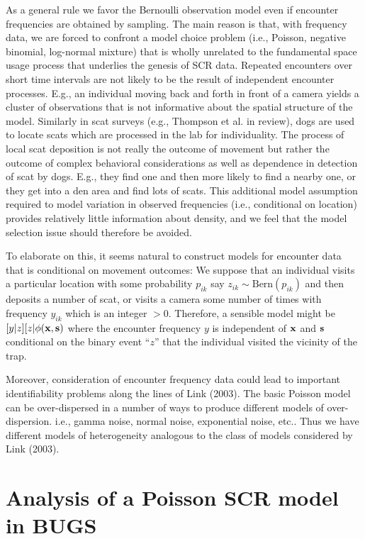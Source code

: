 As a general rule we favor the Bernoulli observation model even if
encounter frequencies are obtained by sampling.  The main reason is
that, with frequency data, we are forced to confront a model choice
problem (i.e., Poisson, negative binomial, log-normal mixture) that is
wholly unrelated to the fundamental space usage process that underlies
the genesis of SCR data. Repeated encounters over short time intervals
are not likely to be the result of independent encounter
processes. E.g., an individual moving back and forth in front of a
camera yields a cluster of observations that is not informative about
the spatial structure of the model. Similarly in scat surveys (e.g.,
Thompson et al. in review), dogs are used to locate scats which are
processed in the lab for individuality.  The process of local scat
deposition is not really the outcome of movement but rather the
outcome of complex behavioral considerations as well as dependence in
detection of scat by dogs. E.g., they find one and then more likely to
find a nearby one, or they get into a den area and find lots of scats.
This additional model assumption required to model variation in
observed frequencies (i.e., conditional on location) provides
relatively little information about density, and we feel that the
model selection issue should therefore be avoided.

To elaborate on this, it seems natural to construct models for
encounter data that is conditional on movement outcomes: We suppose
that an individual visits a particular location with some probability
$p_{ik}$ say $z_{ik}\sim  \mbox{Bern}(p_{ik})$ and then deposits a number of scat,
or visits a camera some number of times with frequency $y_{ik}$ which
is 
an integer $> 0$. Therefore, a sensible model might be
$[y|z][z|\phi({\bf x},{\bf s})$
where the encounter frequency $y$ is independent of ${\bf x}$ and
${\bf s}$ conditional
on the binary event ``$z$'' that the individual visited the vicinity of
the trap.

Moreover, consideration of encounter frequency data could lead to
important identifiability problems along the lines of Link (2003). The
basic Poisson model can be over-dispersed in a number of ways to
produce different models of over-dispersion.  i.e., gamma noise,
normal noise, exponential noise, etc..  Thus we have different models
of heterogeneity analogous to the class of models considered by Link
(2003).

\section{Analysis of a Poisson SCR model in BUGS}

